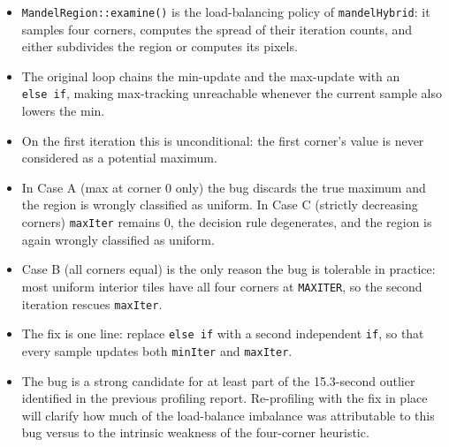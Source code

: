 \documentclass[
	english,
	letterpaper, oneside
]{article}
\begin{document}
\begin{itemize}
    \item \texttt{MandelRegion::examine()} is the load-balancing
          policy of \texttt{mandelHybrid}: it samples four corners,
          computes the spread of their iteration counts, and either
          subdivides the region or computes its pixels.
    \item The original loop chains the min-update and the max-update
          with an \texttt{else~if}, making max-tracking unreachable
          whenever the current sample also lowers the min.
    \item On the first iteration this is unconditional: the first
          corner's value is never considered as a potential maximum.
    \item In Case A (max at corner 0 only) the bug discards the true
          maximum and the region is wrongly classified as uniform.
          In Case C (strictly decreasing corners) \texttt{maxIter}
          remains 0, the decision rule degenerates, and the region
          is again wrongly classified as uniform.
    \item Case B (all corners equal) is the only reason the bug is
          tolerable in practice: most uniform interior tiles have all
          four corners at \texttt{MAXITER}, so the second iteration
          rescues \texttt{maxIter}.
    \item The fix is one line: replace \texttt{else~if} with a second
          independent \texttt{if}, so that every sample updates both
          \texttt{minIter} and \texttt{maxIter}.
    \item The bug is a strong candidate for at least part of the
          15.3-second outlier identified in the previous profiling
          report. Re-profiling with the fix in place will clarify how
          much of the load-balance imbalance was attributable to this
          bug versus to the intrinsic weakness of the four-corner
          heuristic.
\end{itemize}

\end{document}
